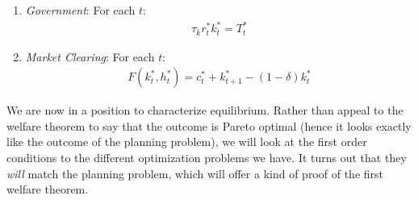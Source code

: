 \documentclass[12pt]{article}
\theoremstyle{plain}
\theoremstyle{definition}
\theoremstyle{remark}
\begin{document}
\begin{enumerate}
  \item \emph{Government}: For each $t$:
    \begin{align}
      \tau_k r^*_t k^*_t = T^*_t
      \label{taxes-govt}
    \end{align}

  \item \emph{Market Clearing}: For each $t$:
    \begin{align}
      F(k^*_t,h_t^*) = c_t^* + k^*_{t+1} - (1-\delta)k_t^*
      \label{taxes-clear}
    \end{align}
\end{enumerate}
We are now in a position to characterize equilibrium. Rather than appeal
to the welfare theorem to say that the outcome is Pareto optimal (hence
it looks exactly like the outcome of the planning problem), we will look
at the first order conditions to the different optimization problems we
have. It turns out that they \emph{will} match the planning problem,
which will offer a kind of proof of the first welfare theorem.
\end{document}
